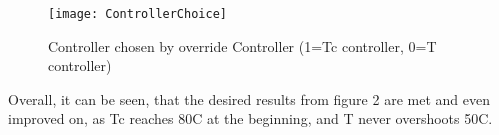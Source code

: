 \begin{figure}[H]
	\centering
	\texttt{[image: ControllerChoice]}
	\caption{Controller chosen by override Controller (1=Tc controller, 0=T controller)}
	\label{fig:controllerChoice}
\end{figure}

Overall, it can be seen, that the desired results from figure 2 are met and even improved on, as Tc reaches 80\degree C at the beginning, and T never overshoots 50\degree C.